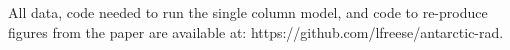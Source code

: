 \documentclass[draft]{agujournal2019}
\begin{document}
%
%
%
%
%
%
%
%


\acknowledgments
All data, code needed to run the single column model, and code to re-produce figures from the paper are available at: https://github.com/lfreese/antarctic-rad. 



%
%





%
%
%
%
%
\end{document}
